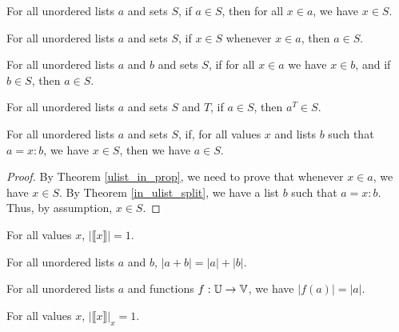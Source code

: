 \documentclass[../../math.tex]{subfiles}
\begin{document}
\begin{theorem} \label{ulist_prop_in}
    For all unordered lists $a$ and sets $S$, if $a \in S$, then for all $x \in
    a$, we have $x \in S$.
\end{theorem}

\begin{theorem} \label{ulist_in_prop}
    For all unordered lists $a$ and sets $S$, if $x \in S$ whenever $x \in a$,
    then $a \in S$.
\end{theorem}

\begin{theorem} \label{ulist_prop_in_sub}
    For all unordered lists $a$ and $b$ and sets $S$, if for all $x \in a$ we
    have $x \in b$, and if $b \in S$, then $a \in S$.
\end{theorem}

\begin{theorem} \label{ulist_prop_other_filter}
    For all unordered lists $a$ and sets $S$ and $T$, if $a \in S$, then $a^T
    \in S$.
\end{theorem}

\begin{theorem} \label{ulist_prop_split}
    For all unordered lists $a$ and sets $S$, if, for all values $x$ and lists
    $b$ such that $a = x : b$, we have $x \in S$, then we have $a \in S$.
\end{theorem}
\begin{proof}
    By Theorem \ref{ulist_in_prop}, we need to prove that whenever $x \in a$, we
    have $x \in S$.  By Theorem \ref{in_ulist_split}, we have a list $b$ such
    that $a = x : b$.  Thus, by assumption, $x \in S$.
\end{proof}

\begin{theorem}
    For all values $x$, $|\llbracket x\rrbracket| = 1$.
\end{theorem}

\begin{theorem} \label{ulist_size_conc}
    For all unordered lists $a$ and $b$, $|a + b| = |a| + |b|$.
\end{theorem}

\begin{theorem} \label{ulist_image_size}
    For all unordered lists $a$ and functions $f : \mathbb{U} \to \mathbb{V}$, we have $|f(a)| =
    |a|$.
\end{theorem}

\begin{theorem}
    For all values $x$, $|\llbracket x\rrbracket |_x = 1$.
\end{theorem}
\end{document}
